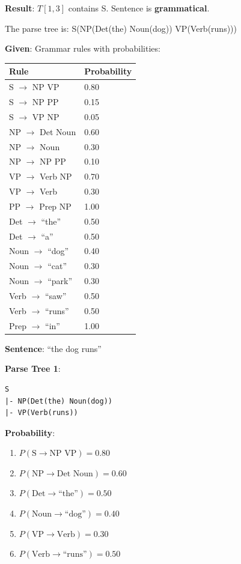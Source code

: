 \documentclass[11pt,a4paper]{article}
\begin{document}
\begin{tcolorbox}[colback=green!5!white,colframe=green!75!black,title=\textbf{Worked Example 27: CKY Parsing Table Construction}]
\textbf{Result}: $T[1,3]$ contains S. Sentence is \textbf{grammatical}.

The parse tree is: S(NP(Det(the) Noun(dog)) VP(Verb(runs)))
\end{tcolorbox}

\begin{tcolorbox}[colback=green!5!white,colframe=green!75!black,title=\textbf{Worked Example 28: PCFG Parse Tree Probability}]
\textbf{Given}: Grammar rules with probabilities:
\begin{center}
\begin{tabular}{|l|l|}
\hline
\textbf{Rule} & \textbf{Probability} \\ \hline
S $\to$ NP VP & 0.80 \\ \hline
S $\to$ NP PP & 0.15 \\ \hline
S $\to$ VP NP & 0.05 \\ \hline
NP $\to$ Det Noun & 0.60 \\ \hline
NP $\to$ Noun & 0.30 \\ \hline
NP $\to$ NP PP & 0.10 \\ \hline
VP $\to$ Verb NP & 0.70 \\ \hline
VP $\to$ Verb & 0.30 \\ \hline
PP $\to$ Prep NP & 1.00 \\ \hline
Det $\to$ ``the'' & 0.50 \\ \hline
Det $\to$ ``a'' & 0.50 \\ \hline
Noun $\to$ ``dog'' & 0.40 \\ \hline
Noun $\to$ ``cat'' & 0.30 \\ \hline
Noun $\to$ ``park'' & 0.30 \\ \hline
Verb $\to$ ``saw'' & 0.50 \\ \hline
Verb $\to$ ``runs'' & 0.50 \\ \hline
Prep $\to$ ``in'' & 1.00 \\ \hline
\end{tabular}
\end{center}

\textbf{Sentence}: ``the dog runs''

\textbf{Parse Tree 1}:
\begin{verbatim}
S
|- NP(Det(the) Noun(dog))
|- VP(Verb(runs))
\end{verbatim}

\textbf{Probability}:
\begin{enumerate}
    \item $P(\text{S} \to \text{NP VP}) = 0.80$
    \item $P(\text{NP} \to \text{Det Noun}) = 0.60$
    \item $P(\text{Det} \to \text{``the''}) = 0.50$
    \item $P(\text{Noun} \to \text{``dog''}) = 0.40$
    \item $P(\text{VP} \to \text{Verb}) = 0.30$
    \item $P(\text{Verb} \to \text{``runs''}) = 0.50$
\end{enumerate}


\end{tcolorbox}
\end{document}
